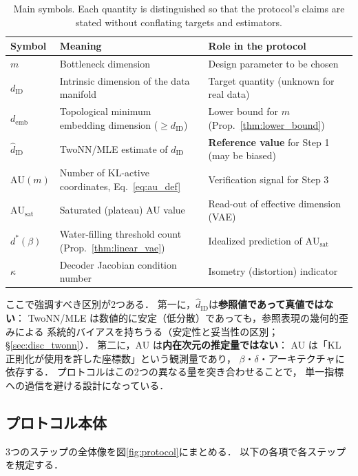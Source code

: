 \documentclass[11pt,a4paper]{jsarticle}
\newcommand{\dID}{d_{\mathrm{ID}}}
\newcommand{\hatdID}{\hat{d}_{\mathrm{ID}}}
\newcommand{\kap}{\kappa}
\newcommand{\AUsat}{\mathrm{AU}_{\mathrm{sat}}}
\newcommand{\demb}{d_{\mathrm{emb}}}
\newcommand{\dstar}{d^{*}(\beta)}
\begin{document}
\begin{table}[H]
\centering
\caption{Main symbols. Each quantity is distinguished so that the protocol's
claims are stated without conflating targets and estimators.}
\label{tab:notation}
\small
\begin{tabular}{lll}
\toprule
Symbol & Meaning & Role in the protocol \\
\midrule
$m$ & Bottleneck dimension & Design parameter to be chosen \\
$\dID$ & Intrinsic dimension of the data manifold & Target quantity (unknown for real data) \\
$\demb$ & Topological minimum embedding dimension ($\geq \dID$) & Lower bound for $m$ (Prop.~\ref{thm:lower_bound}) \\
$\hatdID$ & TwoNN/MLE estimate of $\dID$ & \textbf{Reference value} for Step 1 (may be biased) \\
$\mathrm{AU}(m)$ & Number of KL-active coordinates, Eq.~\eqref{eq:au_def} & Verification signal for Step 3 \\
$\AUsat$ & Saturated (plateau) AU value & Read-out of effective dimension (VAE) \\
$\dstar$ & Water-filling threshold count (Prop.~\ref{thm:linear_vae}) & Idealized prediction of $\AUsat$ \\
$\kap$ & Decoder Jacobian condition number & Isometry (distortion) indicator \\
\bottomrule
\end{tabular}
\end{table}

ここで強調すべき区別が2つある．
第一に，$\hatdID$は\textbf{参照値であって真値ではない}：
TwoNN/MLE は数値的に安定（低分散）であっても，参照表現の幾何的歪みによる
系統的バイアスを持ちうる（安定性と妥当性の区別；§\ref{sec:disc_twonn}）．
第二に，AU は\textbf{内在次元の推定量ではない}：
AU は「KL 正則化が使用を許した座標数」という観測量であり，
$\beta$・$\delta$・アーキテクチャに依存する．
プロトコルはこの2つの異なる量を突き合わせることで，
単一指標への過信を避ける設計になっている．

\subsection{プロトコル本体}\label{sec:protocol_main}

3つのステップの全体像を図\ref{fig:protocol}にまとめる．
以下の各項で各ステップを規定する．
\end{document}
